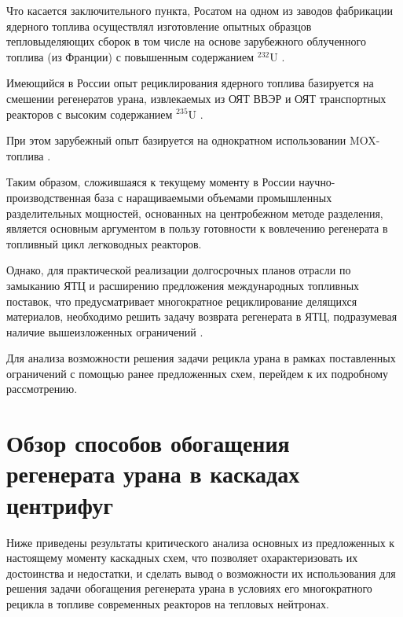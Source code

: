 Что касается заключительного пункта, Росатом на одном из заводов фабрикации ядерного топлива осуществлял изготовление опытных образцов тепловыделяющих сборок в том числе на основе зарубежного облученного топлива (из Франции) с повышенным содержанием $^{232}$U \cite{kislovRadiacionnyeAspektyIspolzovaniya}.

Имеющийся в России опыт рециклирования ядерного топлива базируется на смешении регенератов урана, извлекаемых из ОЯТ ВВЭР и ОЯТ транспортных реакторов с высоким содержанием $^{235}$U \cite{international2003iaea}.

При этом зарубежный опыт базируется на однократном использовании MOX-топлива \cite{international2003iaea}.


Таким образом, сложившаяся к текущему моменту в России научно-производственная база с наращиваемыми объемами промышленных разделительных мощностей, основанных на центробежном методе разделения, является основным аргументом в пользу готовности к вовлечению регенерата в топливный цикл легководных реакторов.

Однако, для практической реализации долгосрочных планов отрасли по замыканию ЯТЦ и расширению предложения международных топливных поставок, что предусматривает многократное рециклирование делящихся материалов, необходимо решить задачу возврата регенерата в ЯТЦ, подразумевая наличие вышеизложенных ограничений \cite{RosatomGoskorporaciyaRosatoma,panteleyOsobennostiMezhdunarodnogoSotrudnichestva2017}.

Для анализа возможности решения задачи рецикла урана в рамках поставленных ограничений с помощью ранее предложенных схем, перейдем к их подробному рассмотрению.

\section{Обзор способов обогащения регенерата урана в каскадах центрифуг}

Ниже приведены результаты критического анализа основных из предложенных к настоящему моменту каскадных схем, что позволяет охарактеризовать их достоинства и недостатки,  и сделать вывод о возможности их использования для решения задачи обогащения регенерата урана в условиях его многократного рецикла в топливе современных реакторов на тепловых нейтронах.


